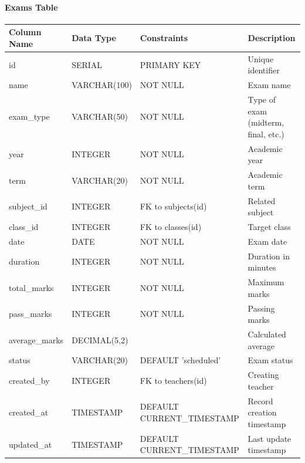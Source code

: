 \documentclass[12pt,a4paper]{report}
\begin{document}
\paragraph{Exams Table}
\begin{longtable}{|p{3cm}|p{3cm}|p{2cm}|p{6cm}|}
\hline
\textbf{Column Name} & \textbf{Data Type} & \textbf{Constraints} & \textbf{Description} \\
\hline
\endhead
id & SERIAL & PRIMARY KEY & Unique identifier \\
\hline
name & VARCHAR(100) & NOT NULL & Exam name \\
\hline
exam\_type & VARCHAR(50) & NOT NULL & Type of exam (midterm, final, etc.) \\
\hline
year & INTEGER & NOT NULL & Academic year \\
\hline
term & VARCHAR(20) & NOT NULL & Academic term \\
\hline
subject\_id & INTEGER & FK to subjects(id) & Related subject \\
\hline
class\_id & INTEGER & FK to classes(id) & Target class \\
\hline
date & DATE & NOT NULL & Exam date \\
\hline
duration & INTEGER & NOT NULL & Duration in minutes \\
\hline
total\_marks & INTEGER & NOT NULL & Maximum marks \\
\hline
pass\_marks & INTEGER & NOT NULL & Passing marks \\
\hline
average\_marks & DECIMAL(5,2) & & Calculated average \\
\hline
status & VARCHAR(20) & DEFAULT 'scheduled' & Exam status \\
\hline
created\_by & INTEGER & FK to teachers(id) & Creating teacher \\
\hline
created\_at & TIMESTAMP & DEFAULT CURRENT\_TIMESTAMP & Record creation timestamp \\
\hline
updated\_at & TIMESTAMP & DEFAULT CURRENT\_TIMESTAMP & Last update timestamp \\
\hline
\end{longtable}
\end{document}
